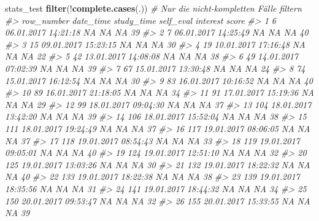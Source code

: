\documentclass[12pt,ngerman,]{book}
\makeatletter
\newenvironment{Shaded}{\begin{snugshade}}{\end{snugshade}}
\newcommand{\KeywordTok}[1]{\textcolor[rgb]{0.13,0.29,0.53}{\textbf{{#1}}}}
\newcommand{\StringTok}[1]{\textcolor[rgb]{0.31,0.60,0.02}{{#1}}}
\newcommand{\CommentTok}[1]{\textcolor[rgb]{0.56,0.35,0.01}{\textit{{#1}}}}
\newcommand{\NormalTok}[1]{{#1}}
\newenvironment{kframe}{%
\medskip{}
\setlength{\fboxsep}{.8em}
 \def\at@end@of@kframe{}%
 \ifinner\ifhmode%
  \def\at@end@of@kframe{\end{minipage}}%
  \begin{minipage}{\columnwidth}%
 \fi\fi%
 \def\FrameCommand##1{\hskip\@totalleftmargin \hskip-\fboxsep
 \colorbox{shadecolor}{##1}\hskip-\fboxsep
     \hskip-\linewidth \hskip-\@totalleftmargin \hskip\columnwidth}%
 \MakeFramed {\advance\hsize-\width
   \@totalleftmargin\z@ \linewidth\hsize
   \@setminipage}}%
 {\par\unskip\endMakeFramed%
 \at@end@of@kframe}
\renewenvironment{Shaded}{\begin{kframe}}{\end{kframe}}
\makeatother
\begin{document}
\begin{Shaded}
\begin{Highlighting}[]
\NormalTok{stats_test %
\StringTok{   }\KeywordTok{filter}\NormalTok{(!}\KeywordTok{complete.cases}\NormalTok{(.))  }\CommentTok{# Nur die nicht-kompletten Fälle filtern}
\CommentTok{#>    row_number           date_time study_time self_eval interest score}
\CommentTok{#> 1           6 06.01.2017 14:21:18         NA        NA       NA    39}
\CommentTok{#> 2           7 06.01.2017 14:25:49         NA        NA       NA    40}
\CommentTok{#> 3          15 09.01.2017 15:23:15         NA        NA       NA    30}
\CommentTok{#> 4          19 10.01.2017 17:16:48         NA        NA       NA    22}
\CommentTok{#> 5          42 13.01.2017 14:08:08         NA        NA       NA    38}
\CommentTok{#> 6          49 14.01.2017 07:02:39         NA        NA       NA    39}
\CommentTok{#> 7          67 15.01.2017 13:30:48         NA        NA       NA    24}
\CommentTok{#> 8          74 15.01.2017 16:12:54         NA        NA       NA    30}
\CommentTok{#> 9          83 16.01.2017 10:16:52         NA        NA       NA    40}
\CommentTok{#> 10         89 16.01.2017 21:18:05         NA        NA       NA    34}
\CommentTok{#> 11         91 17.01.2017 15:19:36         NA        NA       NA    29}
\CommentTok{#> 12         99 18.01.2017 09:04:30         NA        NA       NA    37}
\CommentTok{#> 13        104 18.01.2017 13:42:20         NA        NA       NA    39}
\CommentTok{#> 14        106 18.01.2017 15:52:04         NA        NA       NA    38}
\CommentTok{#> 15        111 18.01.2017 19:24:49         NA        NA       NA    37}
\CommentTok{#> 16        117 19.01.2017 08:06:05         NA        NA       NA    37}
\CommentTok{#> 17        118 19.01.2017 08:54:43         NA        NA       NA    33}
\CommentTok{#> 18        119 19.01.2017 09:05:01         NA        NA       NA    40}
\CommentTok{#> 19        124 19.01.2017 12:51:10         NA        NA       NA    32}
\CommentTok{#> 20        125 19.01.2017 13:03:26         NA        NA       NA    30}
\CommentTok{#> 21        132 19.01.2017 18:22:32         NA        NA       NA    40}
\CommentTok{#> 22        133 19.01.2017 18:22:38         NA        NA       NA    38}
\CommentTok{#> 23        139 19.01.2017 18:35:56         NA        NA       NA    31}
\CommentTok{#> 24        141 19.01.2017 18:44:32         NA        NA       NA    34}
\CommentTok{#> 25        150 20.01.2017 09:53:47         NA        NA       NA    32}
\CommentTok{#> 26        155 20.01.2017 15:33:55         NA        NA       NA    39}
}
\end{Highlighting}
\end{Shaded}
\end{document}
